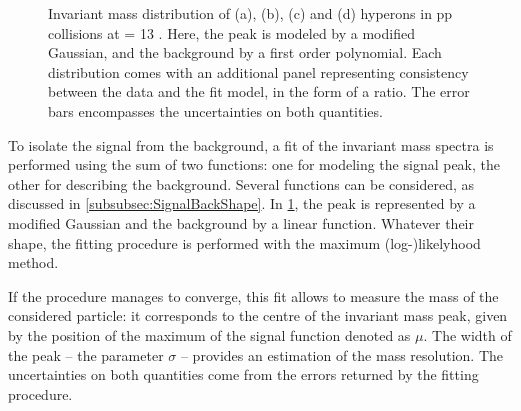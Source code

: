 \begin{figure}[!t]
{	\label{fig:OmegaMinus_ModGaussian}
} 
\caption{Invariant mass distribution of \rmXiM (a), \rmAxiP (b), \rmOmegaM (c) and \rmAomegaP (d) hyperons in pp collisions at \sqrtS = 13 \tev. Here, the peak is modeled by a modified Gaussian, and the background by a first order polynomial. Each distribution comes with an additional panel representing consistency between the data and the fit model, in the form of a ratio. The error bars encompasses the uncertainties on both quantities.}
	\label{fig:InvMassCascades}
\end{figure}

To isolate the signal from the background, a fit of the invariant mass spectra is performed using the sum of two functions: one for modeling the signal peak, the other for describing the background. Several functions can be considered, as discussed in \Sec\ref{subsubsec:SignalBackShape}. In \figs\ref{fig:InvMassCascades}, the peak is represented by a modified Gaussian \cite{atlascollaborationKshortLambdaProduction2012} and the background by a linear function. Whatever their shape, the fitting procedure is performed with the maximum (log-)likelyhood method.

If the procedure manages to converge, this fit allows to measure the mass of the considered particle: it corresponds to the centre of the invariant mass peak, given by the position of the maximum of the signal function denoted as $\mu$. The width of the peak -- the parameter $\sigma$ -- provides an estimation of the mass resolution. The uncertainties on both quantities come from the errors returned by the fitting procedure.

